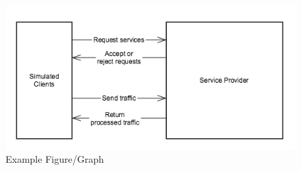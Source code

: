 \documentclass{sig-alternate}
\begin{document}



\begin{figure}[htb!]
  \begin{center}
    \includegraphics[width=12cm]{system}
  \end{center}
  \vspace{-12pt}
  \caption{Example Figure/Graph}
  \label{fig:some_graph}
\end{figure}
\end{document}
